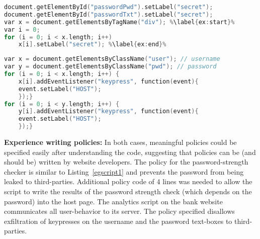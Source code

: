 \begin{lstlisting}[float, caption=Policy code for password strength
  checking website,label=realpolicy1,language=C,escapechar=\%]
document.getElementById("passwordPwd").setLabel("secret");
document.getElementById("passwordTxt").setLabel("secret");
var x = document.getElementsByTagName("div"); %\label{ex:start}%
var i = 0;
for (i = 0; i < x.length; i++) 
    x[i].setLabel("secret"); %\label{ex:end}%
\end{lstlisting}

\begin{lstlisting}[float, caption=Policy code for bank login
  website with an analytics script,label=realpolicy2,language=C] 
var x = document.getElementsByClassName("user"); // username
var y = document.getElementsByClassName("pwd"); // password
for (i = 0; i < x.length; i++) {
    x[i].addEventListener("keypress", function(event){
    event.setLabel("HOST");
    });}
for (i = 0; i < y.length; i++) {
    y[i].addEventListener("keypress", function(event){
    event.setLabel("HOST");
    });}
\end{lstlisting}

\noindent
\textbf{Experience writing policies:} In both cases, meaningful
policies could be specified easily after understanding the code,
suggesting that {\sys} policies can be (and should be) written by
website developers. The policy for the password-strength
checker is similar to Listing~\ref{egscript1} and prevents the
password from being leaked to third-parties. Additional policy code of
4 lines was needed to allow the script to write the results of
the password strength check (which depends on the password) into the
host page.
%
The analytics script on the bank website communicates all
user-behavior to its server.  The policy specified disallows
exfiltration of keypresses on the username and the password text-boxes 
to third-parties.



